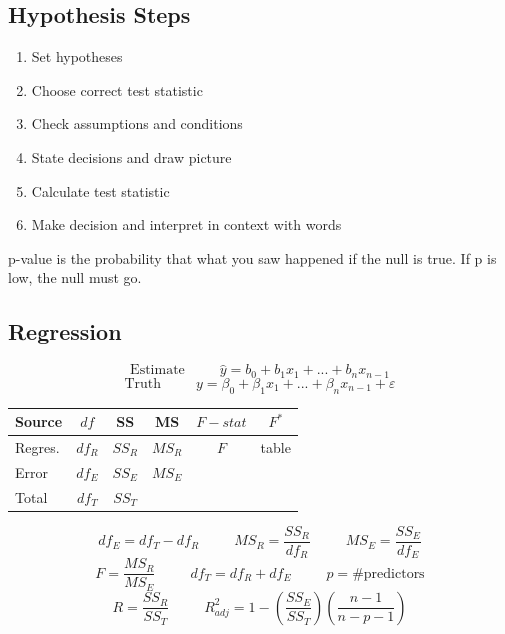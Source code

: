 \documentclass[twocolumn, 12pt]{article}    %
\begin{document}
\subsection*{Hypothesis Steps}
\begin{enumerate}
    \item Set hypotheses
    \item Choose correct test statistic
    \item Check assumptions and conditions
    \item State decisions and draw picture
    \item Calculate test statistic
    \item Make decision and interpret in context with words
\end{enumerate}
p-value is the probability that what you saw happened if the null is true. If p is low, the null must go.


\subsection*{Regression}
\begin{equation*}
    \text{Estimate} \hspace{30pt} \hat{y} = b_0 + b_1x_1 + ... + b_nx_{n-1}
\end{equation*}
\begin{equation*}
    \text{Truth} \hspace{30pt} y = \beta_0 + \beta_1x_1 + ... +\beta_nx_{n-1} + \varepsilon
\end{equation*}

\begin{table}[h!]
    \centering
    \footnotesize
    \begin{tabular}{lccccc}
        Source & \(df\) & SS & MS & \(F-stat\) & \(F^*\)  \\
        \hline
        Regres. & \(df_R\) & \(SS_R\) & \(MS_R\) & \(F\)& table\\
        Error & \(df_E\) & \(SS_E\) & \(MS_E \) & \\
        Total & \(df_T\) & \(SS_T\) & \\
        \hline
    \end{tabular}
\end{table}
\begin{equation*}
    df_E=df_T-df_R \hspace{30pt} MS_R = \frac{SS_R}{df_R} \hspace{30pt} MS_E = \frac{SS_E}{df_E}
\end{equation*}
\begin{equation*}
    F =\frac{MS_R}{MS_E} \hspace{30pt} df_T = df_R+df_E \hspace{30pt} p = \text{\# predictors}
\end{equation*}
\begin{equation*}
    R = \frac{SS_R}{SS_T} \hspace{30pt} R^2_{adj} = 1- \left(\frac{SS_E}{SS_T} \right) \left( \frac{n-1}{n-p-1} \right)
\end{equation*}
\end{document}
